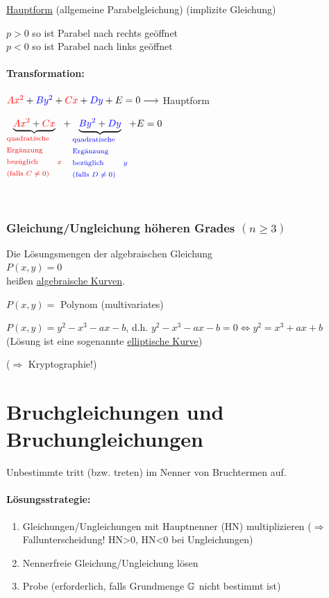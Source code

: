\begin{enumerate}[A)]
	\ul{Hauptform} (allgemeine Parabelgleichung)
	 (implizite Gleichung)
	
	$p>0$ so ist Parabel nach rechts geöffnet\\
	$p<0$ so ist Parabel nach links geöffnet
	
	\clearpage
	\paragraph{Transformation:} $\textcolor{red}{Ax^2}+\textcolor{blue}{By^2}+\textcolor{red}{Cx}+\textcolor{blue}{Dy}+E=0 \longrightarrow$ Hauptform
	
	$\underbrace{\red{Ax^2}+\red{Cx}}_\text{\parbox{2cm}{\red{quadratische Ergänzung bezüglich $x$ (falls $C\ne0$)}}}+\underbrace{\blue{By^2}+\blue{Dy}}_\text{\parbox{2cm}{\blue{quadratische Ergänzung bezüglich $y$ (falls $D\ne0$)}}}+E=0$
	

	\\
	\gray{\vdots}
\end{enumerate}

\clearpage
\subsubsection{Gleichung/Ungleichung höheren Grades $(n\ge 3)$}
Die Lösungsmengen der algebraischen Gleichung\\
$P(x,y)=0$\\
heißen \ul{algebraische Kurven}.

$P(x,y)=$ Polynom (multivariates)

\Bsp $P(x,y) = y^2-x^3-ax-b$, d.h. $y^2-x^3-ax-b=0 \Leftrightarrow y^2=x^3+ax+b$ (Lösung ist eine sogenannte \ul{elliptische Kurve})


($\Rightarrow$ Kryptographie!)

\clearpage
\section{Bruchgleichungen und Bruchungleichungen}
Unbestimmte tritt (bzw. treten) im Nenner von Bruchtermen auf.

\paragraph{Lösungsstrategie:}
\begin{enumerate}
	\item Gleichungen/Ungleichungen mit Hauptnenner (HN) multiplizieren ($\Rightarrow$ Fallunterscheidung! HN>0, HN<0 bei Ungleichungen)
	\item Nennerfreie Gleichung/Ungleichung lösen
	\item Probe (erforderlich, falls Grundmenge $\mathbb{G}$ nicht bestimmt ist)
\end{enumerate}

